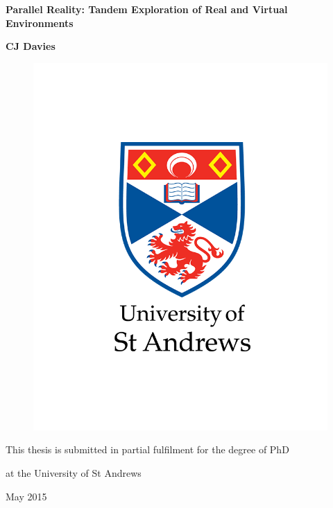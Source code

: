 \documentclass[a4paper]{report}
\begin{document}


\thispagestyle{empty}

\begin{center}
	\textbf{\Huge{Parallel Reality: Tandem Exploration of Real and Virtual Environments}}
\end{center}

\vspace{15mm}

\begin{center}
	\textbf{\Huge{CJ Davies}}
\end{center}

\begin{figure}[h]
	\begin{center}
		\includegraphics[width=.6\textwidth]{crest.png}
	\end{center}
\end{figure}

\begin{center}
	\Large{This thesis is submitted in partial fulfilment for the degree of PhD
	
	at the University of St Andrews}
\end{center}

\vspace{2mm}

\begin{center}
	\Large{May 2015}
\end{center}

\end{document}
